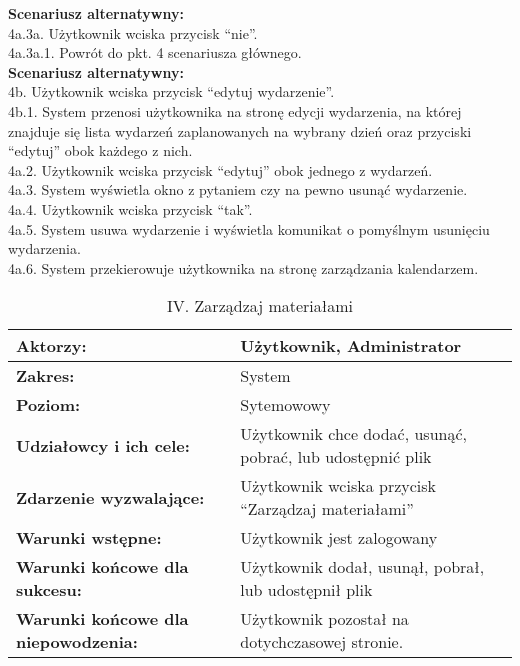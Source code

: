 \textbf{Scenariusz alternatywny:}\\
4a.3a. Użytkownik wciska przycisk “nie”.\\
4a.3a.1. Powrót do pkt. 4 scenariusza głównego.\\
\textbf{Scenariusz alternatywny:}\\
4b. Użytkownik wciska przycisk “edytuj wydarzenie”.\\
4b.1. System przenosi użytkownika na stronę edycji wydarzenia, na której znajduje się lista
wydarzeń zaplanowanych na wybrany dzień oraz przyciski “edytuj” obok każdego z nich.\\
4a.2. Użytkownik wciska przycisk “edytuj” obok jednego z wydarzeń.\\
4a.3. System wyświetla okno z pytaniem czy na pewno usunąć wydarzenie.\\
4a.4. Użytkownik wciska przycisk “tak”.\\
4a.5. System usuwa wydarzenie i wyświetla komunikat o pomyślnym usunięciu wydarzenia.\\
4a.6. System przekierowuje użytkownika na stronę zarządzania kalendarzem.\\

\newpage
	\begin{table}[H]
\centering
\caption{IV. Zarządzaj materiałami}
\label{zarządzajmaterialami:}
\begin{tabular}{|p{7cm}|p{7cm}|}
  \hline 
  \textbf{Aktorzy:} & Użytkownik, Administrator\\
  \hline
  \textbf{Zakres:} & System \\
	\hline
  \textbf{Poziom:} & Sytemowowy \\
	\hline
  \textbf{Udziałowcy i ich cele: } & Użytkownik chce dodać, usunąć, pobrać, lub udostępnić plik \\
	\hline
  \textbf{Zdarzenie wyzwalające: } & Użytkownik wciska przycisk “Zarządzaj materiałami” \\
	\hline
  \textbf{Warunki wstępne: } & Użytkownik jest zalogowany
 \\
	\hline
  \textbf{Warunki końcowe dla sukcesu:} &Użytkownik dodał, usunął, pobrał, lub udostępnił plik
 \\
	\hline
  \textbf{Warunki końcowe dla niepowodzenia:} & Użytkownik pozostał na dotychczasowej stronie. \\
  \hline
\end{tabular} 
\end{table}

